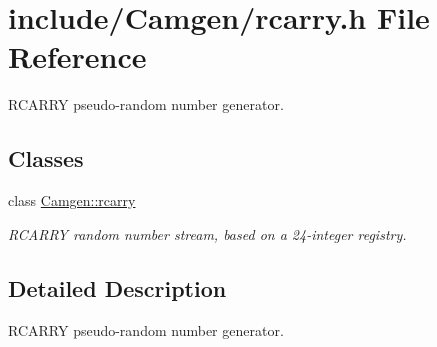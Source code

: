 \hypertarget{a00757}{}\section{include/\+Camgen/rcarry.h File Reference}
\label{a00757}


R\+C\+A\+R\+R\+Y pseudo-\/random number generator.  


\subsection*{Classes}
\begin{DoxyCompactItemize}
\item 
class \hyperlink{a00472}{Camgen\+::rcarry}
\begin{DoxyCompactList}\small\item\em R\+C\+A\+R\+R\+Y random number stream, based on a 24-\/integer registry. \end{DoxyCompactList}\end{DoxyCompactItemize}


\subsection{Detailed Description}
R\+C\+A\+R\+R\+Y pseudo-\/random number generator. 

